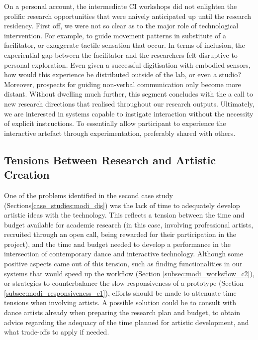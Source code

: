On a personal account, the intermediate CI workshops did not enlighten the prolific research opportunities that were naively anticipated up until the research residency. First off, we were not so clear as to the major role of technological intervention. For example, to guide movement patterns in substitute of a facilitator, or exaggerate tactile sensation that occur. In terms of inclusion, the experiential gap between the facilitator and the researchers felt disruptive to personal exploration. Even given a successful digitisation with embodied sensors, how would this experience be distributed outside of the lab, or even a studio? Moreover, prospects for guiding non-verbal communication only become more distant. Without dwelling much further, this segment concludes with the a call to new research directions that realised throughout our research outputs. Ultimately, we are interested in systems capable to instigate interaction without the necessity of explicit instructions. To essentially allow participant to experience the interactive artefact through experimentation, preferably shared with others.

\subsection{Tensions Between Research and Artistic Creation}

One of the problems identified in the second case study (Sections\ref{case_studies:modi_dis}) was the lack of time to adequately develop artistic ideas with the technology.%
This reflects a tension between the time and budget available for academic research (in this case, involving professional artists, recruited through an open call, being rewarded for their participation in the project), and the time and budget needed to develop a performance in the intersection of contemporary dance and interactive technology. Although some positive aspects came out of this tension, such as finding functionalities in our systems that would speed up the workflow (Section \ref{subsec:modi_worksflow_c2}), or strategies to counterbalance the slow responsiveness of a prototype (Section \ref{subsec:modi_responsiveness_c1}), efforts should be made to attenuate time tensions when involving artists. A possible solution could be to consult with dance artists already when preparing the research plan and budget, to obtain advice regarding the adequacy of the time planned for artistic development, and what trade-offs to apply if needed.

